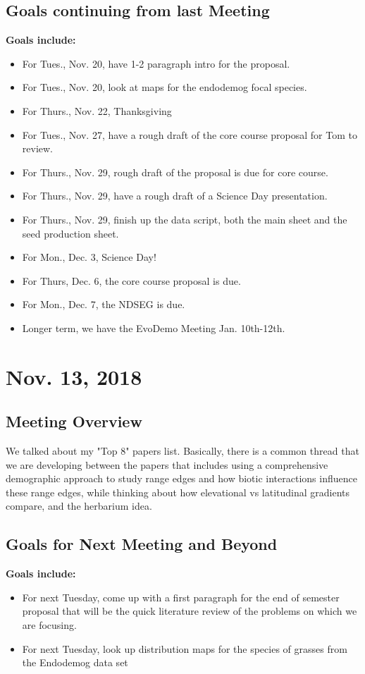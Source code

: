 \documentclass{article}
\begin{document}
\subsection*{Goals continuing from last Meeting}
\textbf{Goals include:}
\begin{itemize}
\item{For Tues., Nov. 20, have 1-2 paragraph intro for the proposal.}
\item{For Tues., Nov. 20, look at maps for the endodemog focal species.}
\item{For Thurs., Nov. 22, Thanksgiving}
\item{For Tues., Nov. 27, have a rough draft of the core course proposal for Tom to review.}
\item{For Thurs., Nov. 29, rough draft of the proposal is due for core course.}
\item{For Thurs., Nov. 29, have a rough draft of a Science Day presentation.}
\item{For Thurs., Nov. 29, finish up the data script, both the main sheet and the seed production sheet.}
\item{For Mon., Dec. 3, Science Day!}
\item{For Thurs, Dec. 6, the core course proposal is due.}
\item{For Mon., Dec. 7, the NDSEG is due.}
\item{Longer term, we have the EvoDemo Meeting Jan. 10th-12th.}
\end{itemize}

\section*{Nov. 13, 2018}
\subsection*{Meeting Overview}

We talked about my "Top 8" papers list. Basically, there is a common thread that we are developing between the papers that includes using a comprehensive demographic approach to study range edges and how biotic interactions influence these range edges,  while thinking about how elevational vs latitudinal gradients compare, and the herbarium idea. 

\subsection*{Goals for Next Meeting and Beyond}
\textbf{Goals include:}
\begin{itemize}
\item{For next Tuesday, come up with a first paragraph for the end of semester proposal that will be the quick literature review of the problems on which we are focusing.}
\item{For next Tuesday, look up distribution maps for the species of grasses from the Endodemog data set}
\end{itemize}
\end{document}
